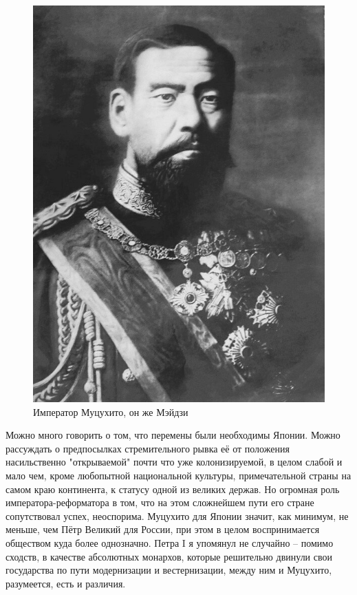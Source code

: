 \begin{figure}[h!tb] 
	\centering\includegraphics[scale=0.5]{Glava2/0eUExR5UGBw.jpg}
	\caption{Император Муцухито, он же Мэйдзи}%
\end{figure}

Можно много говорить о том, что перемены были необходимы Японии. Можно рассуждать о предпосылках стремительного рывка её от положения насильственно "открываемой" почти что уже колонизируемой, в целом слабой и мало чем, кроме любопытной национальной культуры, примечательной страны на самом краю континента, к статусу одной из великих держав. Но огромная роль императора-реформатора в том, что на этом сложнейшем пути его стране сопутствовал успех, неоспорима. Муцухито для Японии значит, как минимум, не меньше, чем Пётр Великий для России, при этом в целом воспринимается обществом куда более однозначно. Петра I я упомянул не случайно – помимо сходств, в качестве абсолютных монархов, которые решительно двинули свои государства по пути модернизации и вестернизации, между ним и Муцухито, разумеется, есть и различия.

